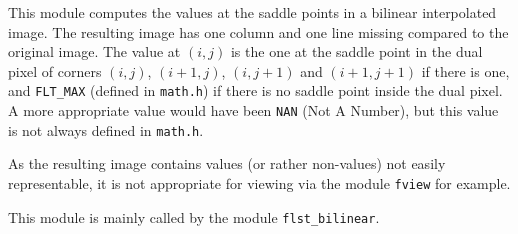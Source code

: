 This module computes the values at the saddle points in a bilinear
interpolated image. The resulting image has one column and one line missing
compared to the original image. The value at $(i,j)$ is the one at the saddle
point in the dual pixel of corners $(i,j)$, $(i+1,j)$, $(i,j+1)$ and
$(i+1,j+1)$ if there is one, and \texttt{FLT\_MAX} (defined in \texttt{math.h})
if there is no saddle point inside the dual pixel. A more appropriate value
would have been \texttt{NAN} (Not A Number), but this value is not always
defined in \texttt{math.h}.

As the resulting image contains values (or rather non-values) not easily
representable, it is not appropriate for viewing via the module \texttt{fview}
for example.

This module is mainly called by the module \texttt{flst\_bilinear}.
